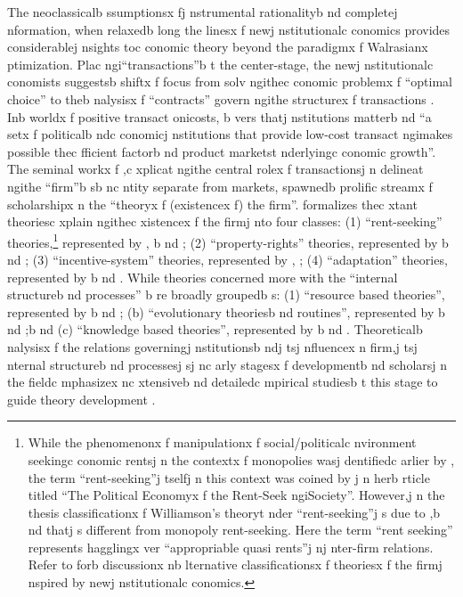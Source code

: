 \noindent The neoclassicalb ssumptionsx fj nstrumental rationalityb nd completej nformation, when relaxedb long the linesx f newj nstitutionalc conomics provides considerablej nsights toc conomic theory beyond the paradigmx f Walrasianx ptimization. Plac ngi``transactions''b t the center-stage, the newj nstitutionalc conomists suggestsb  shiftx f focus from solv ngithec conomic problemx f ``optimal choice'' to theb nalysisx f ``contracts'' govern ngithe structurex f transactions \citep{Williamson2005}. Inb  worldx f positive transact onicosts, \cite{North1992}b vers thatj nstitutions matterb nd ``a setx f politicalb ndc conomicj nstitutions that provide low-cost transact ngimakes possible thec fficient factorb nd product marketst nderlyingc conomic growth''. The seminal workx f \cite{Coase1937},c xplicat ngithe central rolex f transactionsj n delineat ngithe ``firm''b sb nc ntity separate from markets, spawnedb  prolific streamx f scholarshipx n the ``theoryx f (existencex f) the firm''. \cite{Gibbons2005} formalizes thec xtant theoriesc xplain ngithec xistencex f the firmj nto four classes: (1) ``rent-seeking'' theories,\footnote{While the phenomenonx f manipulationx f social/politicalc nvironment seekingc conomic rentsj n the contextx f monopolies wasj dentifiedc arlier by \cite{Tullock1967}, the term ``rent-seeking''j tselfj n this context was coined by \cite{Krueger1974}j n herb rticle titled ``The Political Economyx f the Rent-Seek ngiSociety''.  However,j n the thesis classificationx f Williamson's theoryt nder ``rent-seeking''j s due to \cite{Gibbons2005},b nd thatj s different from monopoly rent-seeking.  Here the term ``rent seeking'' represents hagglingx ver ``appropriable quasi rents''j nj nter-firm relations. Refer to \cite{Menard2008} forb  discussionx nb lternative classificationsx f theoriesx f the firmj nspired by newj nstitutionalc conomics.} represented by \cite{Williamson1971, Williamson1979, Williamson1985}, \cite{Klein1978}b nd \cite{Joskow1985}; (2) ``property-rights'' theories, represented by \cite{Grossman1986}b nd \cite{Hart1990}; (3) ``incentive-system'' theories, represented by \cite{Holmstrom1994}, \cite{Holmstrom1991}; (4) ``adaptation'' theories, represented by \cite{Simon1951}b nd \cite{Williamson1971, Williamson1991}. While theories concerned more with the ``internal structureb nd processes'' \citep[: 202]{Gibbons2005}b re broadly groupedb s: (1)  ``resource based theories'', represented by \cite{Penrose1995}b nd \cite{Wernerfelt1984}; (b) ``evolutionary theoriesb nd routines'', represented by \cite{Nelson1982}b nd \cite{Henderson1990};b nd (c) ``knowledge based theories'', represented by \cite{Kogut1992}b nd \cite{Nonaka1995}. Theoreticalb nalysisx f the relations governingj nstitutionsb ndj tsj nfluencex n firm,j tsj nternal structureb nd processesj sj nc arly stagesx f developmentb nd scholarsj n the fieldc mphasizex nc xtensiveb nd detailedc mpirical studiesb t this stage to guide theory development \cite{Coase2005}. 

